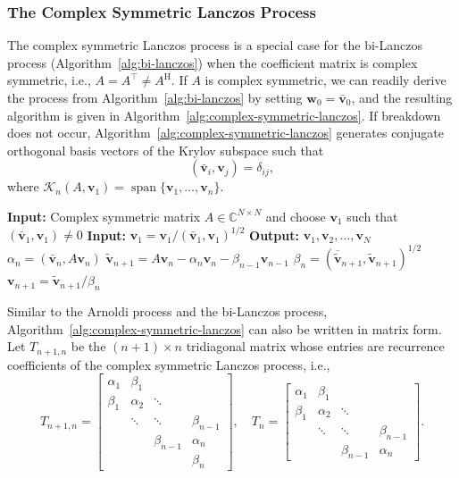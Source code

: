 \subsubsection{{The Complex Symmetric Lanczos Process}}\label{subsec:complex-symmetric-lanczos}
{The complex symmetric Lanczos process is a special case for the bi-Lanczos process (Algorithm~\ref{alg:bi-lanczos}) when the coefficient matrix is complex symmetric, i.e., $A=A^\top\ne A^{\mathrm H}$. If $A$ is complex symmetric, we can readily derive the process from Algorithm~\ref{alg:bi-lanczos} by setting $\bm w_0=\bar{\bm v}_0$, and the resulting algorithm is given in Algorithm~\ref{alg:complex-symmetric-lanczos}.}
{If breakdown does not occur, Algorithm~\ref{alg:complex-symmetric-lanczos} generates conjugate orthogonal basis vectors of the Krylov subspace such that}
\[(\bar{\bm v}_i,\bm v_j)=\delta_{ij},\]
{where $\mathcal K_n(A,\bm v_1)=\operatorname{span}\{\bm v_1,\ldots,\bm v_n\}$.}
\begin{algorithm}[H]\caption{{The complex symmetric Lanczos process (note: $(\bar{\bm a},\bm b)=\bm a^\top\bm b$)}}\label{alg:complex-symmetric-lanczos}
\begin{algorithmic}[1]
\Statex\textbf{Input:} {Complex symmetric matrix $A\in\mathbb C^{N\times N}$ and choose $\bm v_1$ such that $(\bar{\bm v}_1,\bm v_1)\ne0$}
\Statex\textbf{Input:} $\bm v_1=\bm v_1/(\bar{\bm v}_1,\bm v_1)^{1/2}$
\Statex\textbf{Output:} $\bm v_1,\bm v_2,\ldots,\bm v_N$
\State $\alpha_n=(\bar{\bm v}_n,A\bm v_n)$
\State $\tilde{\bm v}_{n+1}=A\bm v_n-\alpha_n\bm v_n-\beta_{n-1}\bm v_{n-1}$
\State $\beta_n=(\overline{\tilde{\bm v}}_{n+1},\tilde{\bm v}_{n+1})^{1/2}$
\State $\bm v_{n+1}=\tilde{\bm v}_{n+1}/\beta_n$
\EndFor
\end{algorithmic}\end{algorithm}
{Similar to the Arnoldi process and the bi-Lanczos process, Algorithm~\ref{alg:complex-symmetric-lanczos} can also be written in matrix form. Let $T_{n+1,n}$ be the $(n+1)\times n$ tridiagonal matrix whose entries are recurrence coefficients of the complex symmetric Lanczos process, i.e.,}
\[
T_{n+1,n}=\begin{bmatrix}\alpha_1&\beta_1&&\\\beta_1&\alpha_2&\ddots&\\&\ddots&\ddots&\beta_{n-1}\\&&\beta_{n-1}&\alpha_n\\&&&\beta_n\end{bmatrix},\quad
T_n=\begin{bmatrix}\alpha_1&\beta_1&&\\\beta_1&\alpha_2&\ddots&\\&\ddots&\ddots&\beta_{n-1}\\&&\beta_{n-1}&\alpha_n\end{bmatrix}.
\]
